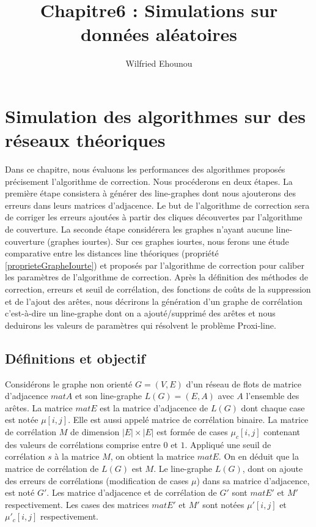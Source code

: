 \documentclass[onecolumn, 12pt]{book}
\title{Chapitre6 : Simulations sur donn\'ees al\'eatoires}
\author{Wilfried Ehounou}
\date{\oldstylenums{\today}}
\begin{document}
\maketitle
\tableofcontents

\chapter{Simulation des algorithmes sur des r\'eseaux th\'eoriques}
Dans ce chapitre, nous \'evaluons les performances des algorithmes propos\'es pr\'ecisement l'algorithme de correction. Nous proc\'ederons en deux \'etapes. 
La premi\`ere \'etape consistera  \`a g\'en\'erer des line-graphes dont nous ajouterons des erreurs dans leurs matrices d'adjacence. Le but de l'algorithme de correction sera de corriger les erreurs ajout\'ees \`a partir des cliques d\'ecouvertes par l'algorithme de couverture. 
La seconde \'etape consid\'erera les graphes n'ayant aucune line-couverture (graphes iourtes). Sur ces graphes iourtes, nous ferons  une \'etude comparative entre les distances line th\'eoriques (propri\'et\'e \ref{proprieteGrapheIourte}) et propos\'es par l'algorithme de correction pour caliber les param\`etres de l'algorithme de correction. \newline
Apr\`es la d\'efinition des m\'ethodes de correction, erreurs et seuil de corr\'elation, des fonctions de co\^uts de la suppression et de l'ajout des ar\^etes, nous d\'ecrirons la g\'en\'eration d'un graphe de corr\'elation c'est-\`a-dire un line-graphe dont on a ajout\'e/supprim\'e des ar\^etes et nous deduirons les valeurs de param\`etres qui r\'esolvent le probl\`eme Proxi-line. 

\section{D\'efinitions et objectif}
Consid\'erons le graphe non orient\'e $G = (V,E)$ d'un r\'eseau de flots de matrice d'adjacence $matA$ et son line-graphe $L(G) = (E, A)$ avec $A$ l'ensemble des ar\^etes.
La matrice $matE$ est la matrice d'adjacence de $L(G)$ dont chaque case est not\'ee $\mu[i,j]$. Elle est aussi appel\'e matrice de corr\'elation binaire.
La matrice de corr\'elation $M$ de dimension $|E| \times |E|$ est form\'ee de cases $\mu_c[i,j]$ contenant des valeurs de corr\'elations comprise entre $0$ et $1$. 
Appliqu\'e une seuil de corr\'elation  $s$ \`a la matrice $M$, on obtient la matrice $matE$. On en d\'eduit que la matrice de corr\'elation de $L(G)$ est $M$. \newline
Le line-graphe $L(G)$, dont on ajoute des erreurs de corr\'elations (modification de cases $\mu$) dans sa matrice d'adjacence, est not\'e $G'$. Les matrice d'adjacence et de corr\'elation de $G'$ sont $matE'$ et $M'$ respectivement. Les cases des matrices $matE'$ et $M'$ sont not\'ees  $\mu'[i,j]$ et $\mu'_c[i,j]$ respectivement.
 
\end{document}
